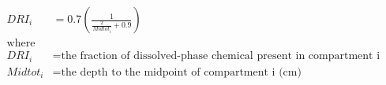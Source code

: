 \documentclass[fleqn, oneside, 11pt]{article}%
\begin{document}
\begin{preview}
\begin{align*}%
DRI_{i} & = 0.7(\frac{1}{\frac{2}{Midtot_{i}}+0.9}) \\ 
\text{where} \nonumber \\
DRI_{i} & =  \text{the fraction of dissolved-phase chemical present in compartment i available for runoff} \nonumber \\
Midtot_{i} & = \text{the depth to the midpoint of compartment i (cm)} \nonumber \\
\end{align*} 
\end{preview}
\end{document}

